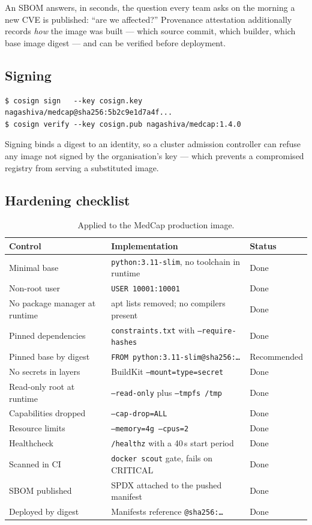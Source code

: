 \documentclass[10pt,a4paper]{article}
\begin{document}
An SBOM answers, in seconds, the question every team asks on the morning
a new CVE is published: ``are we affected?'' Provenance attestation
additionally records \emph{how} the image was built --- which source
commit, which builder, which base image digest --- and can be verified
before deployment.

\subsection{Signing}

\begin{lstlisting}[style=shell]
$ cosign sign   --key cosign.key nagashiva/medcap@sha256:5b2c9e1d7a4f...
$ cosign verify --key cosign.pub nagashiva/medcap:1.4.0
\end{lstlisting}

Signing binds a digest to an identity, so a cluster admission controller
can refuse any image not signed by the organisation's key --- which
prevents a compromised registry from serving a substituted image.

\subsection{Hardening checklist}

\begin{table}[htbp]
\centering
\caption{Applied to the MedCap production image.}
\label{tab:checklist}
\footnotesize
\begin{tabularx}{\linewidth}{@{}l X l@{}}
\toprule
\textbf{Control} & \textbf{Implementation} & \textbf{Status} \\
\midrule
Minimal base            & \texttt{python:3.11-slim}, no toolchain in runtime & Done \\
Non-root user           & \texttt{USER 10001:10001} & Done \\
No package manager at runtime & apt lists removed; no compilers present & Done \\
Pinned dependencies     & \texttt{constraints.txt} with \texttt{--require-hashes} & Done \\
Pinned base by digest   & \texttt{FROM python:3.11-slim@sha256:\ldots} & Recommended \\
No secrets in layers    & BuildKit \texttt{--mount=type=secret} & Done \\
Read-only root at runtime & \texttt{--read-only} plus \texttt{--tmpfs /tmp} & Done \\
Capabilities dropped    & \texttt{--cap-drop=ALL} & Done \\
Resource limits         & \texttt{--memory=4g --cpus=2} & Done \\
Healthcheck             & \texttt{/healthz} with a 40\,s start period & Done \\
Scanned in CI           & \texttt{docker scout} gate, fails on CRITICAL & Done \\
SBOM published          & SPDX attached to the pushed manifest & Done \\
Deployed by digest      & Manifests reference \texttt{@sha256:\ldots} & Done \\
\bottomrule
\end{tabularx}
\end{table}
\end{document}
